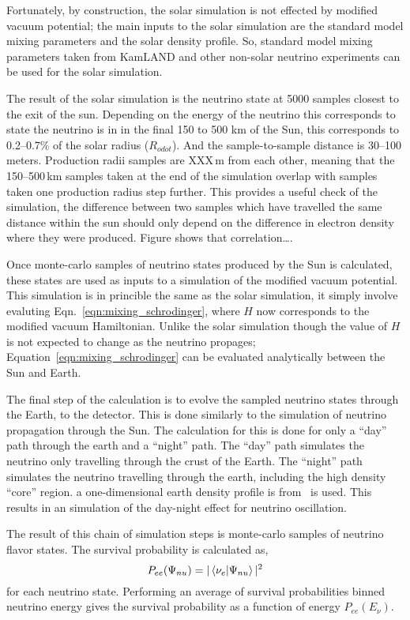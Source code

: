 Fortunately, by construction, the solar simulation is not effected by modified
vacuum potential; the main inputs to the solar simulation are the standard model
mixing parameters and the solar density profile. So, standard model mixing parameters
taken from KamLAND and other non-solar neutrino experiments can be used for
the solar simulation.

The result of the solar simulation is the neutrino state at 5000 samples
closest to the exit of the sun. Depending on the energy of the neutrino this
corresponds to state the neutrino is in in the final  150 to 500 km of
the Sun, this corresponds to \numrange{0.2}{0.7}\% of the solar radius ($R_{odot}$).
And the sample-to-sample distance is \numrange{30}{100} meters.
Production radii samples are XXX\,m from each other, meaning that
the \numrange{150}{500}\,km samples taken at the end of the simulation
overlap with samples taken one production radius step further.
This provides a useful check of the simulation, the difference between two
samples which have travelled the same distance within the sun should only depend
on the difference in electron density where they were produced.
Figure shows that correlation\ldots.%

Once  monte-carlo samples of neutrino states produced by the Sun is calculated, these
states are used as inputs to a simulation of the modified vacuum potential.
This simulation is in princible the same as the solar simulation,
it simply involve evaluting Eqn.~\ref{eqn:mixing_schrodinger}, where $H$ now
corresponds to the modified vacuum Hamiltonian.
Unlike the solar simulation though the value of $H$ is not expected to change
as the neutrino propages; Equation~\ref{eqn:mixing_schrodinger} can be evaluated analytically
between the Sun and Earth.

The final step of the calculation is to evolve the sampled neutrino states through
the Earth, to the detector.
This is done similarly to the simulation of neutrino propagation through the
Sun.
The calculation for this is done for only a ``day'' path through the earth
and a ``night'' path. The ``day'' path simulates the neutrino only travelling
through the crust of the Earth. The ``night'' path simulates the neutrino
travelling through the earth, including the high density ``core'' region.
a one-dimensional earth density profile is from~\cite{prem} is used.
This results in an simulation of the day-night effect for neutrino
oscillation.

The result of this chain of simulation steps is monte-carlo samples
of neutrino flavor states. The survival probability is calculated as,
\begin{equation}
P_{ee}(\Psi_{nu}) = |\bra{\nu_{e}}\ket{\Psi_{nu}}|^2
\end{equation}
for each neutrino state.
Performing an average of survival probabilities binned neutrino energy 
gives the survival probability as a function of energy $P_{ee}(E_{\nu})$.

